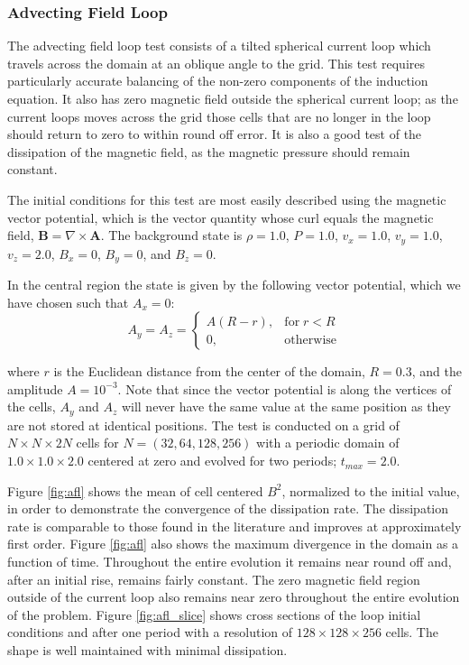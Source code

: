 \documentclass[modern]{aastex631}
\begin{document}
\subsubsection{Advecting Field Loop}
\label{sec:afl}

The advecting field loop test consists of a tilted spherical current loop which travels across the domain at an oblique angle to the grid. This test requires particularly accurate balancing of the non-zero components of the induction equation. It also has zero magnetic field outside the spherical current loop; as the current loops moves across the grid those cells that are no longer in the loop should return to zero to within round off error. It is also a good test of the dissipation of the magnetic field, as the magnetic pressure should remain constant.

The initial conditions for this test are most easily described using the magnetic vector potential, which is the vector quantity whose curl equals the magnetic field, $\boldsymbol{B} = \nabla \times\boldsymbol{A}$. The background state is
$\rho = 1.0$,
$P = 1.0$,
$v_x = 1.0$,
$v_y = 1.0$,
$v_z = 2.0$,
$B_x = 0$,
$B_y = 0$, and
$B_z = 0$.

In the central region the state is given by the following vector potential, which we have chosen such that $A_x = 0$:
\begin{equation}
    A_y = A_z =
    \begin{cases}
        A \left( R - r \right),& \text{for}\; r < R\\
        0,              & \text{otherwise}
    \end{cases}
\end{equation}

\noindent where $r$ is the Euclidean distance from the center of the domain, $R = 0.3$, and the amplitude $A=10^{-3}$. Note that since the vector potential is along the vertices of the cells, $A_y$ and $A_z$ will never have the same value at the same position as they are not stored at identical positions. The test is conducted on a grid of $N\times N\times 2N$ cells for $N=(32, 64, 128, 256)$ with a periodic domain of $1.0\times1.0\times2.0$ centered at zero and evolved for two periods; $t_{max} = 2.0$.

Figure \ref{fig:afl} shows the mean of cell centered $B^2$, normalized to the initial value, in order to demonstrate the convergence of the dissipation rate. The dissipation rate is comparable to those found in the literature \citep{stone_athena_2008} and improves at approximately first order. Figure \ref{fig:afl} also shows the maximum divergence in the domain as a function of time. Throughout the entire evolution it remains near round off and, after an initial rise, remains fairly constant. The zero magnetic field region outside of the current loop also remains near zero throughout the entire evolution of the problem. Figure \ref{fig:afl_slice} shows cross sections of the loop initial conditions and after one period with a resolution of $128\times128\times256$ cells. The shape is well maintained with minimal dissipation.
\end{document}

